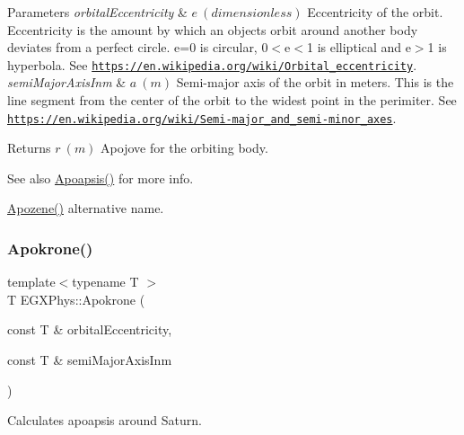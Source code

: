 \begin{DoxyParams}{Parameters}
{\em orbital\+Eccentricity} & $ e\ (dimensionless)$ Eccentricity of the orbit. Eccentricity is the amount by which an objects orbit around another body deviates from a perfect circle. e=0 is circular, 0$<$e$<$1 is elliptical and e$>$1 is hyperbola. See \href{https://en.wikipedia.org/wiki/Orbital_eccentricity}{\tt https\+://en.\+wikipedia.\+org/wiki/\+Orbital\+\_\+eccentricity}. \\
\hline
{\em semi\+Major\+Axis\+Inm} & $ a\ (m)$ Semi-\/major axis of the orbit in meters. This is the line segment from the center of the orbit to the widest point in the perimiter. See \href{https://en.wikipedia.org/wiki/Semi-major_and_semi-minor_axes}{\tt https\+://en.\+wikipedia.\+org/wiki/\+Semi-\/major\+\_\+and\+\_\+semi-\/minor\+\_\+axes}. \\
\hline
\end{DoxyParams}
\begin{DoxyReturn}{Returns}
$ r\ (m)$ Apojove for the orbiting body. 
\end{DoxyReturn}
\begin{DoxySeeAlso}{See also}
\mbox{\hyperlink{group___e_g_x_phys-_apoapsis_gafd08a2d1d64886e7bb9bcb7ff65bc3ea}{Apoapsis()}} for more info. 

\mbox{\hyperlink{group___e_g_x_phys-_apoapsis_ga2de1f63be8e4e22f219c4e947588a207}{Apozene()}} alternative name. 
\end{DoxySeeAlso}
\mbox{\label{group___e_g_x_phys-_apoapsis_ga572bf783c39ce472a06e89063f1fd1a7}} 
\subsubsection{\texorpdfstring{Apokrone()}{Apokrone()}}
{\footnotesize\ttfamily template$<$typename T $>$ \\
T E\+G\+X\+Phys\+::\+Apokrone (\begin{DoxyParamCaption}\item[{const T \&}]{orbital\+Eccentricity,  }\item[{const T \&}]{semi\+Major\+Axis\+Inm }\end{DoxyParamCaption})}



Calculates apoapsis around Saturn. 


